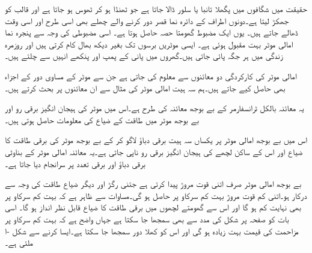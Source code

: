 حقیقت میں شگافوں میں پگھلا تانبا یا سلور  ڈالا جاتا ہے جو ٹھنڈا ہو کر ٹھوس ہو جاتا ہے اور قالب کو جھکڑ لیتا ہے۔دونوں اطراف کے دائرہ نما قصر دور کرنے والے چھلے بھی اسی طرح اور اسی وقت ڈھالے جاتے ہیں۔  یوں ایک مضبوط گھومتا حصہ حاصل ہوتا ہے۔ اسی مضبوطی کی وجہ سے  پنجرہ نما امالی موٹر بہت مقبول ہوئی ہے۔ ایسی موٹریں  برسوں  تک بغیر دیکھ بھال  کام کرتی ہیں اور روزمرہ  زندگی میں ہر جگہ پائی جاتی ہیں۔گھروں میں پانی کے پمپ اور پنکھے انہیں سے چلتے ہیں۔

امالی موٹر کی کارکردگی دو معائنوں سے معلوم کی جاتی ہے جن سے موٹر کے مساوی  دور کے اجزاء  بھی حاصل کیے جاتے ہیں۔ہم سہ ہیت امالی موٹر کی مثال سے ان معائنوں پر بحث کرتے ہیں۔

یہ معائنہ بالکل ٹرانسفارمر کے بے بوجھ معائنہ کی طرح ہے۔اس میں موٹر کی ہیجان انگیز برقی رو اور بے بوجھ موٹر میں طاقت کے ضیاع کی معلومات حاصل ہوتی ہیں۔ 

اس میں  بے بوجھ امالی موٹر پر یکساں سہ ہیت  برقی دباؤ  لاگو کر کے بے بوجھ موٹر کی برقی طاقت کا ضیاع  اور اس کے ساکن لچھے  کی ہیجان انگیز برقی رو  ناپی جاتی ہے۔یہ معائنہ امالی موٹر کے بناوٹی برقی دباؤ اور برقی تعدد پر سرانجام دیا جاتا ہے۔

بے بوجھ امالی موٹر صرف اتنی قوت مروڑ پیدا کرتی ہے جتنی رگڑ اور دیگر ضیاع طاقت کی وجہ سے درکار ہو۔اتنی کم قوت مروڑ بہت کم سرکاو پر حاصل ہو گی۔مساوات   سے ظاہر ہے کہ بہت کم سرکاو پر   بھی نہایت کم ہو گا  اور اس سے گھومتے لچھوں میں برقی طاقت کا ضیاع قابل نظر انداز ہو گا۔ اسی بات کو صفحہ  پر شکل   کی مدد سے بھی سمجھا جا سکتا ہے جہاں  واضح ہے کہ بہت کم سرکاو پر مزاحمت  کی قیمت بہت زیادہ ہو گی اور اس کو کھلا دور سمجھا جا سکتا ہے۔ایسا کرنے سے شکل -ا ملتی ہے۔

